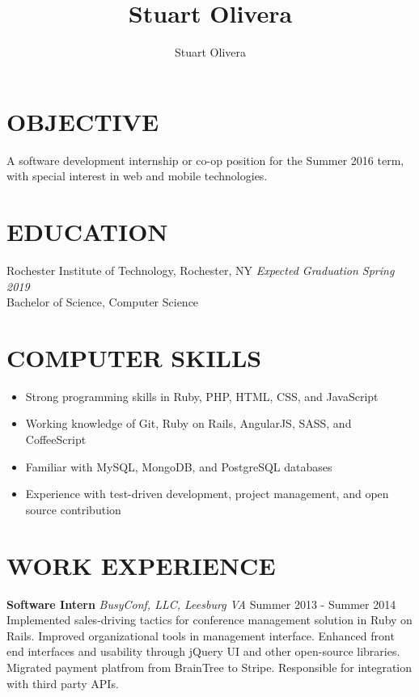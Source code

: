 \documentclass[line]{res}
\author{Stuart Olivera}
\title{Stuart Olivera}
\begin{document}
\setlength{\textheight}{11.5in} %
\address{\large
  42960 Deer Chase Pl
  \\
  Ashburn, VA 20147
  \\
  (703) 509-9523
}
\address{\it
  stuart@stuartolivera.com
  \\
  http://stuartolivera.com/
  \\
  http://linkedin.com/in/stuartolivera
}

\begin{resume}

\section{OBJECTIVE}

  A software development internship or co-op position for the Summer 2016 term, with special interest in web and mobile technologies.

\section{EDUCATION}

  Rochester Institute of Technology, Rochester, NY
  \hfill
  \textit{Expected Graduation Spring 2019}
  \\
  Bachelor of Science, Computer Science

\section{COMPUTER SKILLS}

  \begin{itemize}[leftmargin=10pt]
  \item Strong programming skills in Ruby, PHP, HTML, CSS, and JavaScript
  \item Working knowledge of Git, Ruby on Rails, AngularJS, SASS, and CoffeeScript
  \item Familiar with MySQL, MongoDB, and PostgreSQL databases
  \item Experience with test-driven development, project management, and open source contribution
  \end{itemize}

\section{WORK EXPERIENCE}

  \textbf{Software Intern}
  \textit{BusyConf, LLC, Leesburg VA}
  \hfill
  Summer 2013 - Summer 2014\\
  Implemented sales-driving tactics for conference management solution in Ruby on Rails.
  Improved organizational tools in management interface.
  Enhanced front end interfaces and usability through jQuery UI and other open-source libraries.
  Migrated payment platfrom from BrainTree to Stripe.
  Responsible for integration with third party APIs.


\end{resume}
\end{document}
